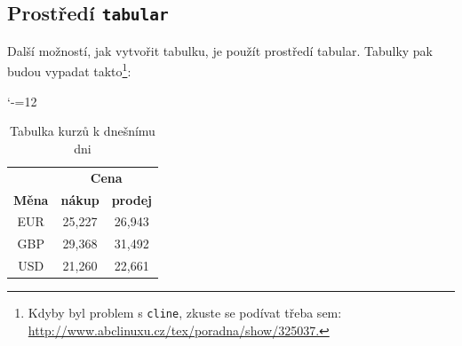 \documentclass[a4paper,11pt]{article}
\begin{document}
\subsection{Prostředí \texttt{tabular}}
Další možností, jak vytvořit tabulku, je použít prostředí tabular. Tabulky pak 
budou vypadat takto\footnote{Kdyby byl problem s \texttt{cline}, zkuste se podívat třeba sem: \hyperlink{http://www.abclinuxu.cz/tex/poradna/show/325037}{http://www.abclinuxu.cz/tex/poradna/show/325037.}}:
\begin{table}[h]
\label{table1}
\catcode`-=12
    \begin{center}
        \begin{tabular}{|c|c|c|}
            \hline
               & \multicolumn{2}{c|}{\textbf{Cena}} \\
             \cline{2-3}
             \textbf{Měna} & \textbf{nákup} & \textbf{prodej} \\
             \hline
             EUR & 25,227 & 26,943 \\
             \hline
             GBP & 29,368 & 31,492 \\
             \hline
             USD & 21,260 & 22,661 \\
             \hline
        \end{tabular}
        \caption{Tabulka kurzů k dnešnímu dni}
    \end{center}
\end{table}
\end{document}
